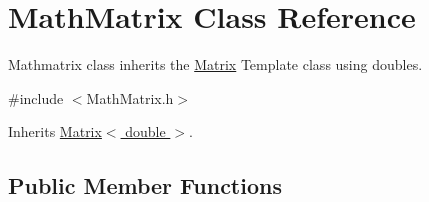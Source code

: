 \hypertarget{class_math_matrix}{\section{Math\-Matrix Class Reference}
\label{class_math_matrix}
}


Mathmatrix class inherits the \hyperlink{class_matrix}{Matrix} Template class using doubles.  




{\ttfamily \#include $<$Math\-Matrix.\-h$>$}



Inherits \hyperlink{class_matrix}{Matrix$<$ double $>$}.

\subsection*{Public Member Functions}
